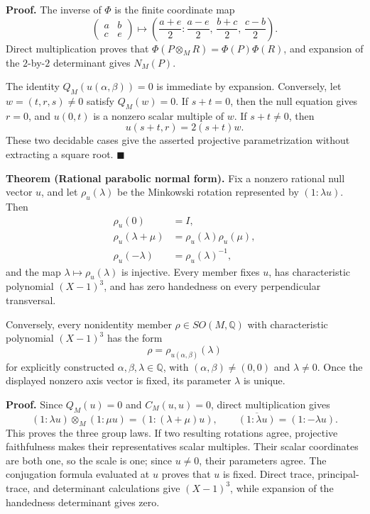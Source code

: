 \documentclass[11pt]{article}
\begin{document}
\smallskip
\noindent\textbf{Proof.}
The inverse of \(\Phi\) is the finite coordinate map
\[
 \begin{pmatrix}a&b\\c&e\end{pmatrix}
 \longmapsto
 \left(\frac{a+e}{2}:
   \frac{a-e}{2},\,\frac{b+c}{2},\,\frac{c-b}{2}\right).
\]
Direct multiplication proves that \(\Phi(P\otimes_M R)=\Phi(P)\Phi(R)\),
and expansion of the \(2\)-by-\(2\) determinant gives \(N_M(P)\).

The identity \(Q_M(u(\alpha,\beta))=0\) is immediate by expansion.  Conversely,
let \(w=(t,r,s)\ne0\) satisfy \(Q_M(w)=0\).  If \(s+t=0\), then the null
equation gives \(r=0\), and \(u(0,t)\) is a nonzero scalar multiple of
\(w\).  If \(s+t\ne0\), then
\[
 u(s+t,r)=2(s+t)w.
\]
These two decidable cases give the asserted projective parametrization
without extracting a square root.
\hfill\(\blacksquare\)

\medskip
\noindent\textbf{Theorem (Rational parabolic normal form).}
Fix a nonzero rational null vector \(u\), and let
\(\rho_u(\lambda)\) be the Minkowski rotation represented by
\((1:\lambda u)\).  Then
\[
\begin{split}
 \rho_u(0)&=I,\\
 \rho_u(\lambda+\mu)&=\rho_u(\lambda)\rho_u(\mu),\\
 \rho_u(-\lambda)&=\rho_u(\lambda)^{-1},
\end{split}
\]
and the map \(\lambda\mapsto\rho_u(\lambda)\) is injective.  Every member
fixes \(u\), has characteristic polynomial \((X-1)^3\), and has zero
handedness on every perpendicular transversal.

Conversely, every nonidentity member \(\rho\in SO(M,\mathbb Q)\) with
characteristic polynomial \((X-1)^3\) has the form
\[
 \rho=\rho_{u(\alpha,\beta)}(\lambda)
\]
for explicitly constructed \(\alpha,\beta,\lambda\in\mathbb Q\), with
\((\alpha,\beta)\ne(0,0)\) and \(\lambda\ne0\).  Once the displayed nonzero
axis vector is fixed, its parameter \(\lambda\) is unique.

\smallskip
\noindent\textbf{Proof.}
Since \(Q_M(u)=0\) and \(C_M(u,u)=0\), direct multiplication gives
\[
 (1:\lambda u)\otimes_M(1:\mu u)=(1:(\lambda+\mu)u),
 \qquad \overline{(1:\lambda u)}=(1:-\lambda u).
\]
This proves the three group laws.  If two resulting rotations agree,
projective faithfulness makes their representatives scalar multiples.
Their scalar coordinates are both one, so the scale is one; since \(u\ne0\),
their parameters agree.  The conjugation formula evaluated at \(u\) proves
that \(u\) is fixed.  Direct trace, principal-trace, and determinant
calculations give \((X-1)^3\), while expansion of the handedness determinant
gives zero.
\end{document}
